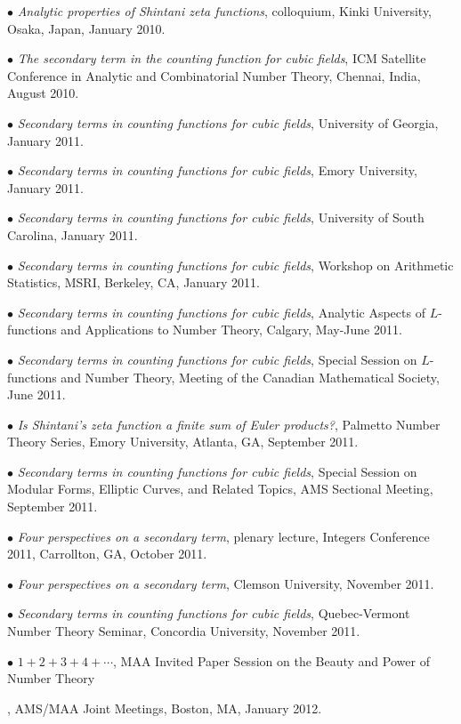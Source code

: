 \documentclass{article}
\newcommand{\categorywidth}{1in}        %
\newcommand{\categorysep}{5pt}
\newcommand{\catlistlabel}[1]%
{\raisebox{0pt}[1ex][0pt]{\makebox[\labelwidth][l]%
    {\parbox[t]{\labelwidth}{\hspace{0pt}\textbf{#1}}}}}
\newenvironment{categories}{\begin{list}{}{
      \setlength{\labelwidth}{\categorywidth}
      \setlength{\leftmargin}{\labelwidth}
      \addtolength{\leftmargin}{\labelsep}
      \setlength{\topsep}{20pt}
      \setlength{\itemsep}{\categorysep}
      \renewcommand{\makelabel}{\catlistlabel}
      }}{\end{list}}
\begin{document}
\begin{flushleft}
\begin{categories}
{$\bullet$ {\itshape Analytic properties of Shintani zeta functions}, colloquium, Kinki University,
Osaka, Japan, January 2010.

$\bullet$ {\itshape The secondary term in the counting function for cubic fields}, 
ICM Satellite Conference in Analytic and Combinatorial Number Theory, Chennai, India, August 2010.

$\bullet$ {\itshape Secondary terms in counting functions for cubic fields},
University of Georgia, January 2011.

$\bullet$ {\itshape Secondary terms in counting functions for cubic fields},
Emory University, January 2011.

$\bullet$ {\itshape Secondary terms in counting functions for cubic fields},
University of South Carolina, January 2011.

$\bullet$ {\itshape Secondary terms in counting functions for cubic fields},
Workshop on Arithmetic Statistics, MSRI, Berkeley, CA, January 2011.

$\bullet$ {\itshape Secondary terms in counting functions for cubic fields},
Analytic Aspects of $L$-functions and Applications to Number Theory,
Calgary, May-June 2011.

$\bullet$ {\itshape Secondary terms in counting functions for cubic fields},
Special Session on $L$-functions and Number Theory, Meeting of the Canadian Mathematical
Society, June 2011.

$\bullet$ {\itshape Is Shintani's zeta function a finite sum of Euler products?},
Palmetto Number Theory Series, Emory University, Atlanta, GA, September 2011.

$\bullet$ {\itshape Secondary terms in counting functions for cubic fields},
Special Session on Modular Forms, Elliptic Curves, and Related Topics,
AMS Sectional Meeting, September 2011.

$\bullet$ {\itshape Four perspectives on a secondary term}, plenary lecture,
Integers Conference 2011, Carrollton, GA, October 2011.

$\bullet$ {\itshape Four perspectives on a secondary term},
Clemson University, November 2011.

$\bullet$ {\itshape Secondary terms in counting functions for cubic fields},
Quebec-Vermont Number Theory Seminar, Concordia University, November 2011.

$\bullet$ {$1 + 2 + 3 + 4 + \cdots$}, MAA Invited Paper Session on the Beauty and
Power of Number Theory}, AMS/MAA Joint Meetings, Boston, MA, January 2012.


\end{categories}
\end{flushleft}
\end{document}
